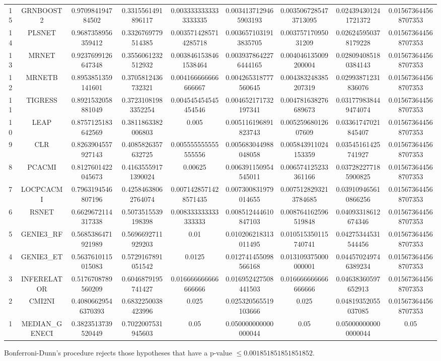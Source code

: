 \documentclass[a4paper,10pt]{article}
\begin{document}
\begin{landscape}
\begin{table}[!htp]
\begin{tabular}{ccccccccc}
15&GRNBOOST2&0.970984194784502&0.3315561491896117&0.0033333333333333335&0.0034137129465903193&0.0035067285473713095&0.024394301241721372&0.015673644568707353\\
14&PLSNET&0.9687358956359412&0.3326769779514385&0.0035714285714285718&0.0036571031913835705&0.00375717095031209&0.026245950378179228&0.015673644568707353\\
13&MRNET&0.9237699126647348&0.3556061232512932&0.0038461538461538464&0.0039378642276444165&0.004046135009200004&0.028094085180384143&0.015673644568707353\\
12&MRNETB&0.8953851359141601&0.3705812436732321&0.004166666666666667&0.004265318777560645&0.004383248385207319&0.02993871231836076&0.015673644568707353\\
11&TIGRESS&0.8921532058881049&0.37231081983352254&0.004545454545454546&0.004652171732197341&0.004781638276689673&0.031779838449474074&0.015673644568707353\\
10&LEAP&0.8757125183642569&0.3811863382006803&0.005&0.005116196891823743&0.00525968012607609&0.03361747021845407&0.015673644568707353\\
9&CLR&0.8263904557927143&0.4085826357632725&0.005555555555555556&0.005683044988048058&0.005843911024153359&0.03545161425741927&0.015673644568707353\\
8&PCACMI&0.8127601422045673&0.41635559171390024&0.00625&0.006391150954545011&0.006574125233361166&0.037282277185900825&0.015673644568707353\\
7&LOCPCACMI&0.7963194546807196&0.42584638062764074&0.0071428571428571435&0.007300831979014655&0.0075128293213784685&0.039109465610866256&0.015673644568707353\\
6&RSNET&0.6629672114317338&0.5073515539198398&0.008333333333333333&0.008512444610847103&0.008764162596519848&0.04093318612674346&0.015673644568707353\\
5&GENIE3_RF&0.5685386471921989&0.5696692711929203&0.01&0.010206218313011495&0.010515350115740741&0.04275344531544456&0.015673644568707353\\
4&GENIE3_ET&0.5637610115015083&0.5729167891051542&0.0125&0.012741455098566168&0.013109375000000001&0.044570249746389234&0.015673644568707353\\
3&INFERELATOR&0.5176708789560209&0.6046879195741427&0.016666666666666666&0.016952427508441503&0.016666666666666666&0.04638360597652913&0.015673644568707353\\
2&CMI2NI&0.40806629546370393&0.6832250038423996&0.025&0.025320565519103666&0.025&0.04819352055037085&0.015673644568707353\\
1&MEDIAN_GENECI&0.3823513739520449&0.7022007531945603&0.05&0.050000000000000044&0.05&0.050000000000000044&0.05\\
\hline
\end{tabular}
\end{table}
Bonferroni-Dunn's procedure rejects those hypotheses that have a p-value $\le0.001851851851851852$.



\end{landscape}
\end{document}
